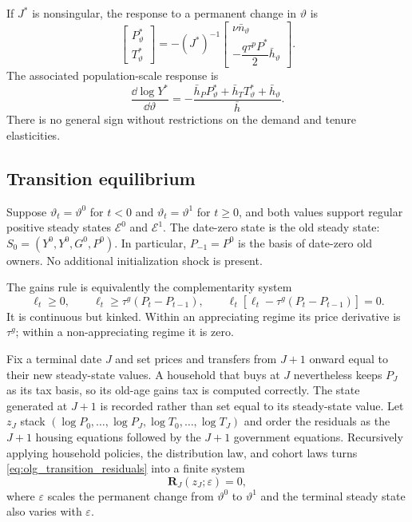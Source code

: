 If $J^*$ is nonsingular, the response to a permanent change in $\vartheta$ is
\begin{equation}
 \begin{bmatrix}P_\vartheta^*\\T_\vartheta^*\end{bmatrix}
 =-(J^*)^{-1}
 \begin{bmatrix}
 \nu\bar n_\vartheta\\[2pt]
 -\dfrac{q\tau^pP^*}{2}\bar h_\vartheta
 \end{bmatrix}.
 \label{eq:olg_app_ss_comparative_static}
\end{equation}
The associated population-scale response is
\begin{equation}
 \frac{\dd\log Y^*}{\dd\vartheta}
 =-\frac{\bar h_PP_\vartheta^*+
 \bar h_TT_\vartheta^*+\bar h_\vartheta}{\bar h}.
 \label{eq:olg_app_scale_response}
\end{equation}
There is no general sign without restrictions on the demand and tenure
elasticities.

\subsection{Transition equilibrium}
\label{app:olg_transitions}

Suppose $\vartheta_t=\vartheta^0$ for $t<0$ and
$\vartheta_t=\vartheta^1$ for $t\geq0$, and both values support regular positive
steady states $\mathcal E^0$ and $\mathcal E^1$.  The date-zero state is the old
steady state: $S_0=(Y^0,Y^0,G^0,P^0)$.  In particular, $P_{-1}=P^0$ is the
basis of date-zero old owners.  No additional initialization shock is present.

The gains rule is equivalently the complementarity system
\begin{equation}
 \ell_t\geq0,\qquad
 \ell_t\geq\tau^g(P_t-P_{t-1}),\qquad
 \ell_t[\ell_t-\tau^g(P_t-P_{t-1})]=0.
 \label{eq:olg_app_gains_complementarity}
\end{equation}
It is continuous but kinked.  Within an appreciating regime its price
derivative is $\tau^g$; within a non-appreciating regime it is zero.

Fix a terminal date $J$ and set prices and transfers from $J+1$ onward equal to
their new steady-state values.  A household that buys at $J$ nevertheless
keeps $P_J$ as its tax basis, so its old-age gains tax is computed correctly.
The state generated at $J+1$ is recorded rather than set equal to its
steady-state value.  Let $z_J$ stack
$(\log P_0,\ldots,\log P_J,\log T_0,\ldots,\log T_J)$ and order the residuals
as the $J+1$ housing equations followed by the $J+1$ government equations.
Recursively applying household policies, the distribution
law, and cohort laws turns \eqref{eq:olg_transition_residuals} into a finite
system
\begin{equation}
 \mathbf R_J(z_J;\varepsilon)=0,
 \label{eq:olg_app_stacked_transition}
\end{equation}
where $\varepsilon$ scales the permanent change from $\vartheta^0$ to
$\vartheta^1$ and the terminal steady state also varies with $\varepsilon$.

